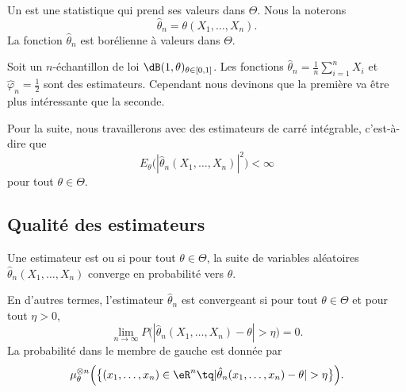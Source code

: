 Un  est une statistique qui prend ses valeurs dans \( \Theta\). Nous la noterons
\begin{equation}
    \hat\theta_n=\theta(X_1,\ldots,X_n).
\end{equation}
La fonction \( \hat\theta_n\) est borélienne à valeurs dans \( \Theta\).

\begin{example}
    Soit un \( n\)-échantillon de loi \( \dB(1,\theta)_{\theta\in\mathopen[ 0 , 1 \mathclose]}\). Les fonctions \( \hat\theta_n=\frac{1}{ n }\sum_{i=1}^nX_i\) et \( \hat\varphi_n=\frac{ 1 }{2}\) sont des estimateurs. Cependant nous devinons que la première va être plus intéressante que la seconde.
\end{example}

Pour la suite, nous travaillerons avec des estimateurs de carré intégrable, c'est-à-dire que
\begin{equation}
    E_{\theta}\big( | \hat\theta_n(X_1,\ldots,X_n) |^2 \big)<\infty
\end{equation}
pour tout \( \theta\in\Theta\).

\subsection{Qualité des estimateurs}

\begin{definition}
    Une estimateur est  ou  si pour tout \( \theta\in\Theta\), la suite de variables aléatoires \( \hat\theta_n(X_1,\ldots,X_n)\) converge en probabilité vers \( \theta\).
\end{definition}
En d'autres termes, l'estimateur \( \hat\theta_n\) est convergeant si pour tout \( \theta\in\Theta\) et pour tout \( \eta>0\),
\begin{equation}
    \lim_{n\to \infty} P\big( | \hat\theta_n(X_1,\ldots,X_n)-\theta |>\eta \big)=0.
\end{equation}
La probabilité dans le membre de gauche est donnée par
\begin{equation}
    \mu^{\otimes n}_{\theta}\Big( \big\{ (x_1,\ldots,x_n)\in\eR^n\tq| \hat\theta_n(x_1,\ldots,x_n)-\theta |>\eta \big\} \Big).
\end{equation}


